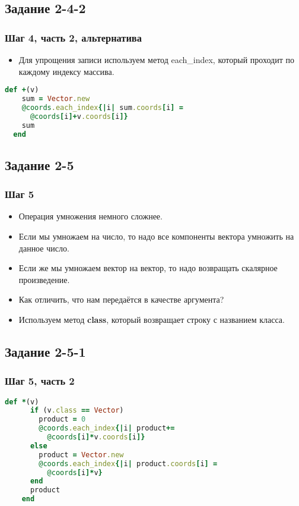\documentclass[compress,red]{beamer}
\begin{document}
\subsection{Задание 2-4-2}
\begin{frame}[fragile]
  \frametitle{Шаг 4, часть 2, альтернатива}
  \begin{itemize}
    \item Для упрощения записи используем метод each\_index, который проходит по каждому индексу массива.
  \end{itemize}
  \scriptsize{
  \begin{lstlisting}[language=ruby,basicstyle=\footnotesize,label=ruby15,caption=Упрощение]
  def +(v)
    sum = Vector.new
    @coords.each_index{|i| sum.coords[i] = 
      @coords[i]+v.coords[i]}
    sum
  end    
  \end{lstlisting}
  }
  
\end{frame}

\subsection{Задание 2-5}
\begin{frame}[fragile]
  \frametitle{Шаг 5}
  \begin{itemize}
    \item Операция умножения немного сложнее.
    \item Если мы умножаем на число, то надо все компоненты вектора умножить на данное число.
    \item Если же мы умножаем вектор на вектор, то надо возвращать скалярное произведение.
    \item Как отличить, что нам передаётся в качестве аргумента?
    \item Используем метод \textbf{class}, который возвращает строку с названием класса.
  \end{itemize}
\end{frame}

\subsection{Задание 2-5-1}
\begin{frame}[fragile]
  \frametitle{Шаг 5, часть 2}
  \scriptsize{
  \begin{lstlisting}[language=ruby,basicstyle=\footnotesize,label=ruby16,caption=Умножение]
    def *(v)
      if (v.class == Vector)
        product = 0
        @coords.each_index{|i| product+=
          @coords[i]*v.coords[i]}
      else
        product = Vector.new
        @coords.each_index{|i| product.coords[i] =
          @coords[i]*v}
      end
      product
    end
  \end{lstlisting}
  }
  
\end{frame}
\end{document}
